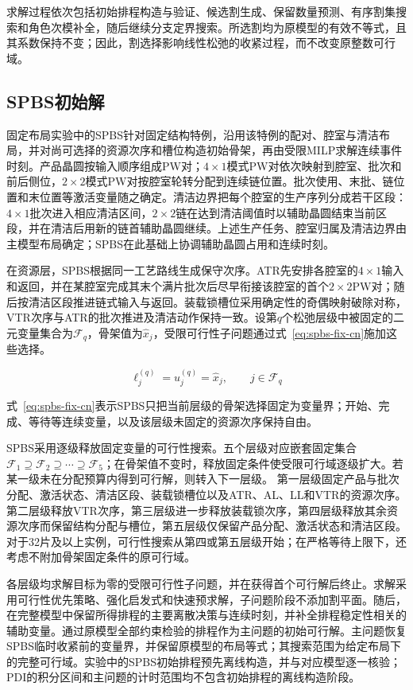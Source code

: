 \documentclass[final,5p,times,twocolumn]{elsarticle}
\begin{document}
求解过程依次包括初始排程构造与验证、候选割生成、保留数量预测、有序割集搜索和角色次模补全，随后继续分支定界搜索。所选割均为原模型的有效不等式，且其系数保持不变；因此，割选择影响线性松弛的收紧过程，而不改变原整数可行域。

\subsection{SPBS初始解}

固定布局实验中的SPBS针对固定结构特例，沿用该特例的配对、腔室与清洁布局，并对尚可选择的资源次序和槽位构造初始骨架，再由受限MILP求解连续事件时刻。产品晶圆按输入顺序组成PW对；$4\times1$模式PW对依次映射到腔室、批次和前后侧位，$2\times2$模式PW对按腔室轮转分配到连续链位置。批次使用、末批、链位置和末位置等激活变量随之确定。清洁边界把每个腔室的生产序列分成若干区段：$4\times1$批次进入相应清洁区间，$2\times2$链在达到清洁阈值时以辅助晶圆结束当前区段，并在清洁后用新的链首辅助晶圆继续。上述生产任务、腔室归属及清洁边界由主模型布局确定；SPBS在此基础上协调辅助晶圆占用和连续时刻。

在资源层，SPBS根据同一工艺路线生成保守次序。ATR先安排各腔室的$4\times1$输入和返回，并在某腔室完成其末个满片批次后尽早衔接该腔室的首个$2\times2$PW对；随后按清洁区段推进链式输入与返回。装载锁槽位采用确定性的奇偶映射破除对称，VTR次序与ATR的批次推进及清洁动作保持一致。设第$q$个松弛层级中被固定的二元变量集合为$\mathcal F_q$，骨架值为$\widehat x_j$，受限可行性子问题通过式~\eqref{eq:spbs-fix-cn}施加这些选择。

\begin{equation}
\ell_j^{(q)}=u_j^{(q)}=\widehat x_j,\qquad j\in\mathcal F_q
\label{eq:spbs-fix-cn}
\end{equation}

式~\eqref{eq:spbs-fix-cn}表示SPBS只把当前层级的骨架选择固定为变量界；开始、完成、等待等连续变量，以及该层级未固定的资源次序保持自由。

SPBS采用逐级释放固定变量的可行性搜索。五个层级对应嵌套固定集合$\mathcal F_1\supseteq\mathcal F_2\supseteq\cdots\supseteq\mathcal F_5$；在骨架值不变时，释放固定条件使受限可行域逐级扩大。若某一级未在分配预算内得到可行解，则转入下一层级。
第一层级固定产品与批次分配、激活状态、清洁区段、装载锁槽位以及ATR、AL、LL和VTR的资源次序。第二层级释放VTR次序，第三层级进一步释放装载锁次序，第四层级释放其余资源次序而保留结构分配与槽位，第五层级仅保留产品分配、激活状态和清洁区段。对于32片及以上实例，可行性搜索从第四或第五层级开始；在严格等待上限下，还考虑不附加骨架固定条件的原可行域。

各层级均求解目标为零的受限可行性子问题，并在获得首个可行解后终止。求解采用可行性优先策略、强化启发式和快速预求解，子问题阶段不添加割平面。随后，在完整模型中保留所得排程的主要离散决策与连续时刻，并补全排程稳定性相关的辅助变量。通过原模型全部约束检验的排程作为主问题的初始可行解。主问题恢复SPBS临时收紧前的变量界，并保留原模型的布局等式；其搜索范围为给定布局下的完整可行域。实验中的SPBS初始排程预先离线构造，并与对应模型逐一核验；PDI的积分区间和主问题的计时范围均不包含初始排程的离线构造阶段。
\end{document}
